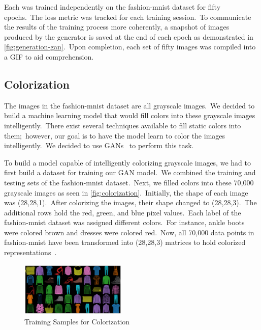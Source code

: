 \documentclass[conference]{IEEEtran}
\begin{document}
    Each was trained independently on the fashion-mnist dataset for fifty epochs.\ The loss metric was tracked for each training session.\ To communicate the results of the training process more coherently, a snapshot of images produced by the generator is saved at the end of each epoch as demonstrated in \autoref{fig:generation-gan}.\ Upon completion, each set of fifty images was compiled into a GIF to aid comprehension.

    \subsection{Colorization}\label{subsec:implementation-colorization}

    The images in the fashion-mnist dataset are all grayscale images.\ We decided to build a machine learning model that would fill colors into these grayscale images intelligently.\ There exist several techniques available to fill static colors into them;\ however, our goal is to have the model learn to color the images intelligently.\ We decided to use GANs~\cite{colorization_GAN} to perform this task.

    To build a model capable of intelligently colorizing grayscale images, we had to first build a dataset for training our GAN model.\ We combined the training and testing sets of the fashion-mnist dataset.\ Next, we filled colors into these 70,000 grayscale images as seen in \autoref{fig:colorization}.\ Initially, the shape of each image was (28,28,1).\ After colorizing the images, their shape changed to (28,28,3).\ The additional rows hold the red, green, and blue pixel values.\ Each label of the fashion-mnist dataset was assigned different colors.\ For instance, ankle boots were colored brown and dresses were colored red.\ Now, all 70,000 data points in fashion-mnist have been transformed into (28,28,3) matrices to hold colorized representations~\cite{initexploration}.

    \begin{figure}
        \caption{Training Samples for Colorization}
        \label{fig:colorization}
        \centering
        \includegraphics[width=0.45\textwidth]{Colorization_training_samples.png}
    \end{figure}
\end{document}
